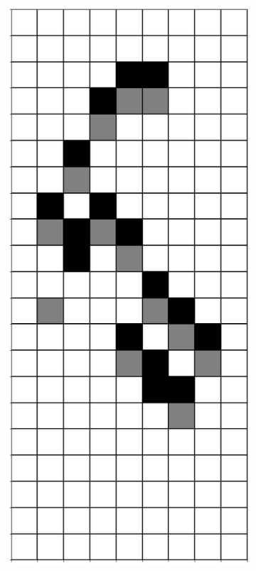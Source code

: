 \documentclass[12pt]{article}
\numberwithin{figure}{section} %
\begin{document}
\begin{figure}[H]
\begin{subfigure}{0.19\textwidth}
     \subcaption{}
   \end{subfigure}
           \begin{subfigure}{0.19\textwidth}
     \centering
     \includegraphics[width=\linewidth]{Section4/25.3}

\end{subfigure}
\end{figure}
\end{document}

